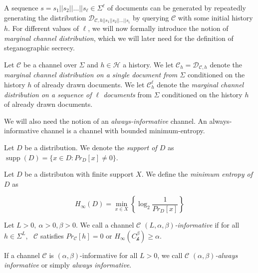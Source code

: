 A sequence $s = s_1||s_2||\dots||s_\ell \in \Sigma^\ell$ of documents can be generated by repeatedly generating the distribution $\mathcal{D}_{\mathcal{C},h||s_1||s_2||\dots||s_i}$ by querying $\mathcal{C}$ with some initial history $h$.
For different values of $\ell$, we will now formally introduce the notion of \emph{marginal channel distribution}, which we will later need for the definition of steganographic secrecy.

\begin{definition}
Let $\mathcal{C}$ be a channel over $\Sigma$ and $h \in \mathcal{H}$ a history.
We let $\mathcal{C}_h = \mathcal{D}_{\mathcal{C},h}$ denote the \emph{marginal channel distribution on a single document from $\Sigma$} conditioned on the history $h$ of already drawn documents.
We let $\mathcal{C}_h^\ell$ denote the \emph{marginal channel distribution on a sequence of $\ell$ documents} from $\Sigma$ conditioned on the history $h$ of already drawn documents.
\end{definition}

We will also need the notion of an \emph{always-informative} channel.
An always-informative channel is a channel with bounded minimum-entropy.

\begin{definition}[Support]
Let $D$ be a distribution.
We denote the \emph{support of $D$} as $\mathop{supp}(D) = \{ x \in D \colon Pr_{D}[x] \neq 0 \}$.
\end{definition}

\begin{definition}
Let $D$ be a distributon with finite support $X$.
We define the \emph{minimum entropy of $D$} as

	$$H_{\infty}(D) = \min_{x \in X}\left\{ \log_2 \frac{1}{ Pr_{D}[x] } \right\}$$
\end{definition}

\begin{definition}
	Let $L > 0,~ \alpha > 0, \beta > 0$. 
	We call a channel \emph{$\mathcal{C}$ $(L, \alpha, \beta)$-informative} if for all $h \in \Sigma^L$,~ $\mathcal{C}$ satisfies $Pr_{\mathcal{C}}[h] = 0$ or $H_{\infty}(C_{\mathcal{h}}^\beta) \geq \alpha$.
	
	If a channel $\mathcal{C}$ is $(\alpha, \beta)$-informative for all $L > 0$, we call $\mathcal{C}$ \emph{$(\alpha, \beta)$-always informative} or simply \emph{always informative}.
\end{definition}

